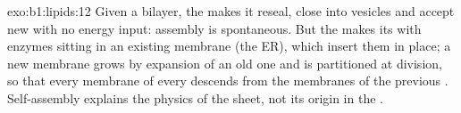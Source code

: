 \begin{solution}{exo:b1:lipids:12}
Given a bilayer, the  makes it reseal, close into
vesicles and accept new  with no energy input: assembly is
spontaneous. But the  makes its  with enzymes sitting in an
existing membrane (the ER), which insert them in place; a new membrane
grows by expansion of an old one and is partitioned at division, so
that every membrane of every  descends from the membranes of the
previous . Self-assembly explains the physics of the sheet, not its
origin in the .
\end{solution}

